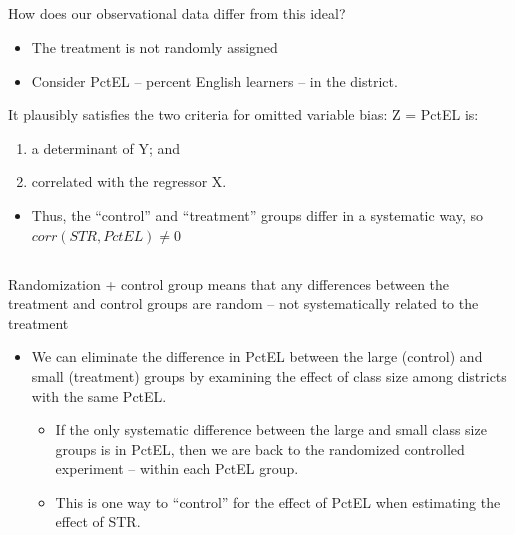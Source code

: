 \documentclass[
  letterpaper,
  DIV=11,
  numbers=noendperiod]{scrartcl}
\providecommand{\tightlist}{%
  \setlength{\itemsep}{0pt}\setlength{\parskip}{0pt}}\usepackage{longtable,booktabs,array}
\begin{document}
\hypertarget{section-7}{%
\subsection{}\label{section-7}}

How does our observational data differ from this ideal?

\begin{itemize}
\item
  The treatment is not randomly assigned
\item
  Consider PctEL -- percent English learners -- in the district.
\end{itemize}

It plausibly satisfies the two criteria for omitted variable bias: Z =
PctEL is:

\begin{enumerate}
\def\labelenumi{(\arabic{enumi})}
\item
  a determinant of Y; and
\item
  correlated with the regressor X.
\end{enumerate}

\begin{itemize}
\tightlist
\item
  Thus, the ``control'' and ``treatment'' groups differ in a systematic
  way, so \(corr(STR,PctEL)\neq0\)
\end{itemize}

\hypertarget{section-8}{%
\subsection{}\label{section-8}}

Randomization + control group means that any differences between the
treatment and control groups are random -- not systematically related to
the treatment

\begin{itemize}
\item
  We can eliminate the difference in PctEL between the large (control)
  and small (treatment) groups by examining the effect of class size
  among districts with the same PctEL.

  \begin{itemize}
  \item
    If the only systematic difference between the large and small class
    size groups is in PctEL, then we are back to the randomized
    controlled experiment -- within each PctEL group.
  \item
    This is one way to ``control'' for the effect of PctEL when
    estimating the effect of STR.
  \end{itemize}
\end{itemize}
\end{document}
